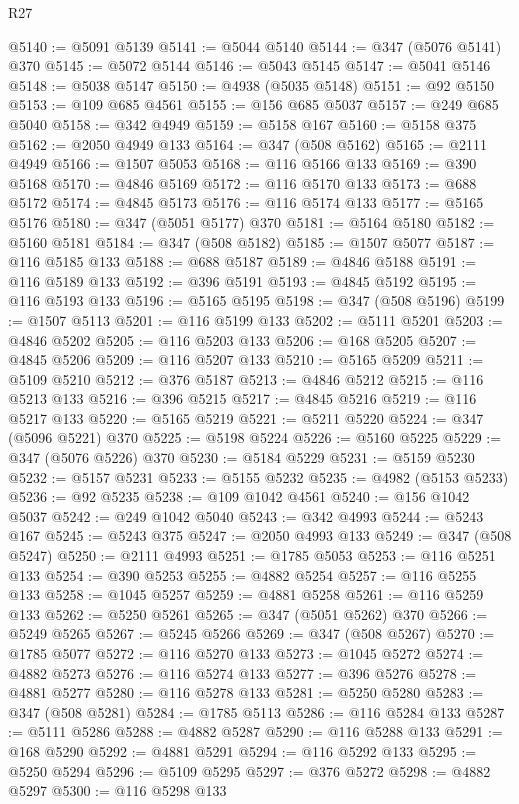 \begin{lexlean}{R27}
\begin{coremodule}
@5140 := @5091 @5139
@5141 := @5044 @5140
@5144 := @347 (@5076 @5141) @370
@5145 := @5072 @5144
@5146 := @5043 @5145
@5147 := @5041 @5146
@5148 := @5038 @5147
@5150 := @4938 (@5035 @5148)
@5151 := @92 @5150
@5153 := @109 @685 @4561
@5155 := @156 @685 @5037
@5157 := @249 @685 @5040
@5158 := @342 @4949
@5159 := @5158 @167
@5160 := @5158 @375
@5162 := @2050 @4949 @133
@5164 := @347 (@508 @5162)
@5165 := @2111 @4949
@5166 := @1507 @5053
@5168 := @116 @5166 @133
@5169 := @390 @5168
@5170 := @4846 @5169
@5172 := @116 @5170 @133
@5173 := @688 @5172
@5174 := @4845 @5173
@5176 := @116 @5174 @133
@5177 := @5165 @5176
@5180 := @347 (@5051 @5177) @370
@5181 := @5164 @5180
@5182 := @5160 @5181
@5184 := @347 (@508 @5182)
@5185 := @1507 @5077
@5187 := @116 @5185 @133
@5188 := @688 @5187
@5189 := @4846 @5188
@5191 := @116 @5189 @133
@5192 := @396 @5191
@5193 := @4845 @5192
@5195 := @116 @5193 @133
@5196 := @5165 @5195
@5198 := @347 (@508 @5196)
@5199 := @1507 @5113
@5201 := @116 @5199 @133
@5202 := @5111 @5201
@5203 := @4846 @5202
@5205 := @116 @5203 @133
@5206 := @168 @5205
@5207 := @4845 @5206
@5209 := @116 @5207 @133
@5210 := @5165 @5209
@5211 := @5109 @5210
@5212 := @376 @5187
@5213 := @4846 @5212
@5215 := @116 @5213 @133
@5216 := @396 @5215
@5217 := @4845 @5216
@5219 := @116 @5217 @133
@5220 := @5165 @5219
@5221 := @5211 @5220
@5224 := @347 (@5096 @5221) @370
@5225 := @5198 @5224
@5226 := @5160 @5225
@5229 := @347 (@5076 @5226) @370
@5230 := @5184 @5229
@5231 := @5159 @5230
@5232 := @5157 @5231
@5233 := @5155 @5232
@5235 := @4982 (@5153 @5233)
@5236 := @92 @5235
@5238 := @109 @1042 @4561
@5240 := @156 @1042 @5037
@5242 := @249 @1042 @5040
@5243 := @342 @4993
@5244 := @5243 @167
@5245 := @5243 @375
@5247 := @2050 @4993 @133
@5249 := @347 (@508 @5247)
@5250 := @2111 @4993
@5251 := @1785 @5053
@5253 := @116 @5251 @133
@5254 := @390 @5253
@5255 := @4882 @5254
@5257 := @116 @5255 @133
@5258 := @1045 @5257
@5259 := @4881 @5258
@5261 := @116 @5259 @133
@5262 := @5250 @5261
@5265 := @347 (@5051 @5262) @370
@5266 := @5249 @5265
@5267 := @5245 @5266
@5269 := @347 (@508 @5267)
@5270 := @1785 @5077
@5272 := @116 @5270 @133
@5273 := @1045 @5272
@5274 := @4882 @5273
@5276 := @116 @5274 @133
@5277 := @396 @5276
@5278 := @4881 @5277
@5280 := @116 @5278 @133
@5281 := @5250 @5280
@5283 := @347 (@508 @5281)
@5284 := @1785 @5113
@5286 := @116 @5284 @133
@5287 := @5111 @5286
@5288 := @4882 @5287
@5290 := @116 @5288 @133
@5291 := @168 @5290
@5292 := @4881 @5291
@5294 := @116 @5292 @133
@5295 := @5250 @5294
@5296 := @5109 @5295
@5297 := @376 @5272
@5298 := @4882 @5297
@5300 := @116 @5298 @133

\end{coremodule}
\end{lexlean}
